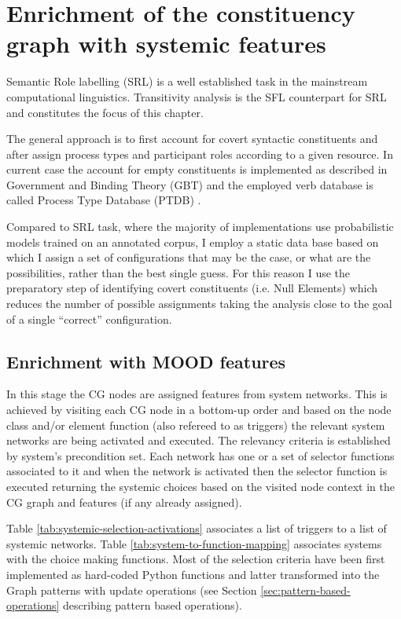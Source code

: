 \chapter{Enrichment of the constituency graph with systemic features}
\label{ch:semantic-parsing}

Semantic Role labelling (SRL) is a well established task in the mainstream computational linguistics. Transitivity analysis is the SFL counterpart for SRL and constitutes the focus of this chapter. 

The general approach is to first account for covert syntactic constituents and after assign process types and participant roles according to a given resource. In current case the account for empty constituents is implemented as described in Government and Binding Theory (GBT) \citep{Haegeman1991} and the employed verb database is called Process Type Database (PTDB) \citep{Neale2002}. 

Compared to SRL task, where the majority of implementations use probabilistic models trained on an annotated corpus, I employ a static data base based on which I assign a set of configurations that may be the case, or what are the possibilities, rather than the best single guess. For this reason I use the preparatory step of identifying covert constituents (i.e. Null Elements) which reduces the number of possible assignments taking the analysis close to the goal of a single ``correct'' configuration.

\section{Enrichment with MOOD features}
\label{sec:enrichment-stage}
In this stage the CG nodes are assigned features from system networks. This is achieved by visiting each CG node in a bottom-up order and based on the node class and/or element function (also refereed to as triggers) the relevant system networks are being activated and executed. The relevancy criteria is established by system's precondition set. Each network has one or a set of selector functions associated to it and when the network is activated then the selector function is executed returning the systemic choices based on the visited node context in the CG graph and features (if any already assigned).

Table \ref{tab:systemic-selection-activations} associates a list of triggers to a list of systemic networks. Table \ref{tab:system-to-function-mapping} associates systems with the choice making functions. Most of the selection criteria have been first implemented as hard-coded Python functions and latter transformed into the Graph patterns with update operations (see Section \ref{sec:pattern-based-operations} describing pattern based operations).

